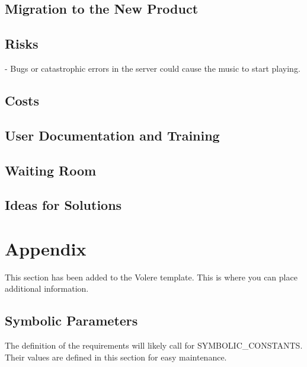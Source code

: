 \documentclass[12pt, titlepage]{article}
\begin{document}
\subsection{Migration to the New Product}

\subsection{Risks}

- Bugs or catastrophic errors in the server could cause the music to start
  playing. \\

\subsection{Costs}

\subsection{User Documentation and Training}

\subsection{Waiting Room}

\subsection{Ideas for Solutions}





\newpage

\section{Appendix}

This section has been added to the Volere template.  This is where you can place
additional information.

\subsection{Symbolic Parameters}

The definition of the requirements will likely call for SYMBOLIC\_CONSTANTS.
Their values are defined in this section for easy maintenance.
\end{document}
